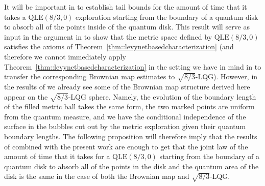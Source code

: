 \documentclass[JEP,XML,SOM,Unicode]{cedram}
\theoremstyle{plain}
\numberwithin{theorem}{section}
\theoremstyle{definition}
\newcommand{\QLE}{\mathrm{QLE}}
\begin{document}
It will be important in \cite{qle_continuity} to establish tail bounds for the amount of time that it takes a $\QLE(8/3,0)$ exploration starting from the boundary of a quantum disk to absorb all of the points inside of the quantum disk. This result will serve as input in the argument in \cite{qle_continuity} to show that the metric space defined by $\QLE(8/3,0)$ satisfies the axioms of Theorem~\ref{thm::levynetbasedcharacterization} (and therefore we cannot immediately apply Theorem~\ref{thm::levynetbasedcharacterization} in the setting we have in mind in \cite{qle_continuity} to transfer the corresponding Brownian map estimates to $\sqrt{8/3}$-LQG). However, in the results of \cite{qlebm} we already see some of the Brownian map structure derived here appear on the $\sqrt{8/3}$-LQG sphere. Namely, the evolution of the boundary length of the filled metric ball takes the same form, the two marked points are uniform from the quantum measure, and we have the conditional independence of the surface in the bubbles cut out by the metric exploration given their quantum boundary lengths. The following proposition will therefore imply that the results of \cite{qlebm} combined with the present work are enough to get that the joint law of the amount of time that it takes for a $\QLE(8/3,0)$ starting from the boundary of a quantum disk to absorb all of the points in the disk and the quantum area of the disk is the same in the case of both the Brownian map and $\sqrt{8/3}$-LQG.
\end{document}
